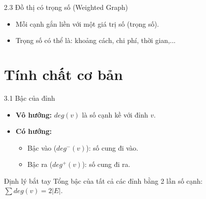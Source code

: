 \documentclass[aspectratio=169]{beamer}
\begin{document}
\begin{frame}{2.3 Đồ thị có trọng số (Weighted Graph)}
    \begin{itemize}
        \item Mỗi cạnh gắn liền với một giá trị số (trọng số).
        \item Trọng số có thể là: khoảng cách, chi phí, thời gian,...
    \end{itemize}
    \centering
\end{frame}

\section{Tính chất cơ bản}
\begin{frame}{3.1 Bậc của đỉnh}
    \begin{itemize}
        \item \textbf{Vô hướng:} $deg(v)$ là số cạnh kề với đỉnh $v$.
        \item \textbf{Có hướng:} 
        \begin{itemize}
            \item Bậc vào ($deg^-(v)$): số cung đi vào.
            \item Bậc ra ($deg^+(v)$): số cung đi ra.
        \end{itemize}
    \end{itemize}
    \begin{exampleblock}{Định lý bắt tay}
        Tổng bậc của tất cả các đỉnh bằng 2 lần số cạnh: $\sum deg(v) = 2|E|$.
    \end{exampleblock}
\end{frame}

\end{document}
